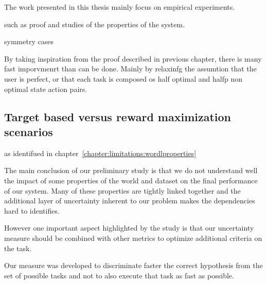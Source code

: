 The work presented in this thesis mainly focus on empirical experiments. 


such as proof and studies of the properties of the system. 

symmetry cases

By taking inspiration from the proof described in previous chapter, there is many fast imporvmenrt than can be done. Mainly by relaxinfg the assumtion that the user is perfect, or that each task is composed os half optimal and halfp non optimal state action pairs.


\subsection{Target based versus reward maximization scenarios}

as identifued in chapter~\ref{chapter:limitations:wordlproperties}

The main conclusion of our preliminary study is that we do not understand well the impact of some properties of the world and dataset on the final performance of our system. Many of these properties are tightly linked together and the additional layer of uncertainty inherent to our problem makes the dependencies hard to identifies.

However one important aspect highlighted by the study is that our uncertainty measure should be combined with other metrics to optimize additional criteria on the task. 

Our measure was developed to discriminate faster the correct hypothesis from the set of possible tasks and not to also execute that task as fast as possible.



